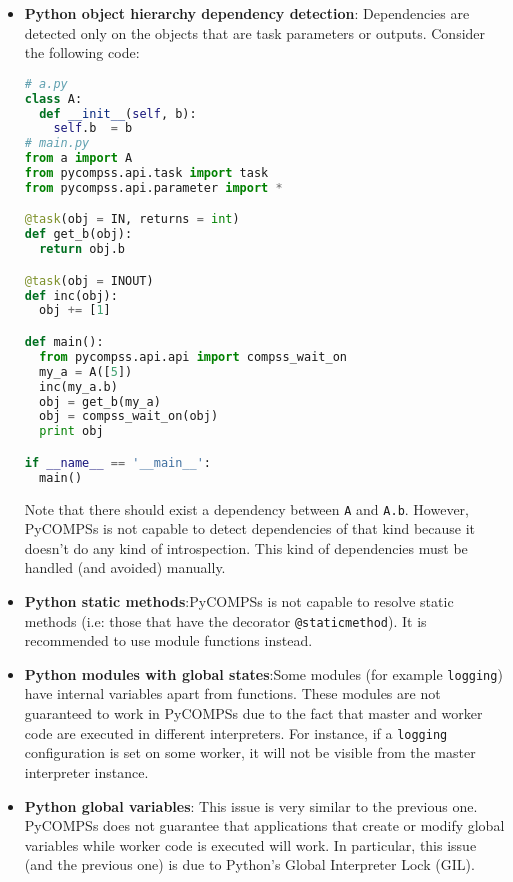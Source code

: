 \begin{itemize}
\item \textbf{Python object hierarchy dependency detection}: \newline Dependencies are detected only on the objects that are task 
parameters or outputs. Consider the following code:
\begin{lstlisting}[language=python]
# a.py
class A:
  def __init__(self, b):
    self.b  = b
# main.py
from a import A
from pycompss.api.task import task
from pycompss.api.parameter import *

@task(obj = IN, returns = int)
def get_b(obj):
  return obj.b

@task(obj = INOUT)
def inc(obj):
  obj += [1]

def main():
  from pycompss.api.api import compss_wait_on
  my_a = A([5])
  inc(my_a.b)
  obj = get_b(my_a)
  obj = compss_wait_on(obj)
  print obj

if __name__ == '__main__':
  main()            
\end{lstlisting}
Note that there should exist a dependency between \verb|A| and \verb|A.b|. However, PyCOMPSs is not capable
to detect dependencies of that kind because it doesn't do any kind of introspection. This kind of dependencies
must be handled (and avoided) manually.

\item \textbf{Python static methods}:\newline PyCOMPSs is not capable to resolve static methods (i.e: those that have the decorator
\verb|@staticmethod|). It is recommended to use module functions
instead.

\item \textbf{Python modules with global states}:\newline Some modules (for example \verb|logging|) have internal variables apart from functions. 
These modules are not guaranteed to work in PyCOMPSs due to the fact that master and worker code are executed in different interpreters. For instance, if a \verb|logging| configuration is set on some
worker, it will not be visible from the master interpreter instance.

\item \textbf{Python global variables}:\newline
This issue is very similar to the previous one. PyCOMPSs does not guarantee that applications that create or modify global variables while
worker code is executed will work. In particular, this issue (and the previous one) is due to Python's Global Interpreter Lock (GIL).


\end{itemize}
